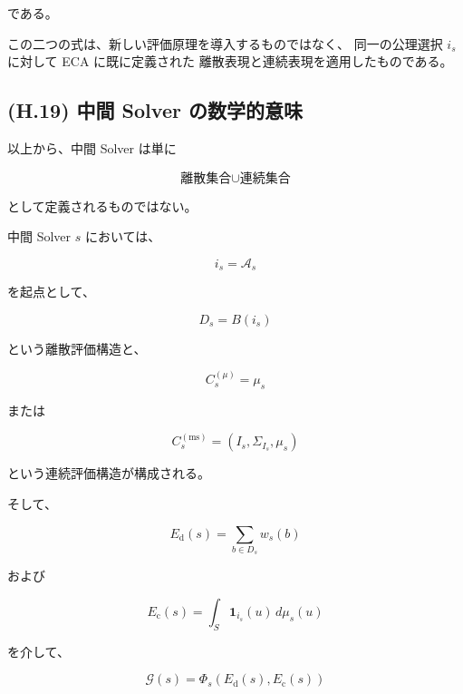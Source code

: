 \documentclass[a4paper,11pt]{article}
\begin{document}
である。

この二つの式は、新しい評価原理を導入するものではなく、
同一の公理選択 $i_s$ に対して ECA に既に定義された
離散表現と連続表現を適用したものである。


\subsection{(H.19) 中間 Solver の数学的意味}
\label{subsec:H19}

以上から、中間 Solver は単に

\begin{equation}
    \text{離散集合}\cup\text{連続集合}
\end{equation}

として定義されるものではない。

中間 Solver $s$ においては、

\begin{equation}
    i_s=\mathcal{A}_s
\end{equation}

を起点として、

\begin{equation}
    D_s=B(i_s)
\end{equation}

という離散評価構造と、

\begin{equation}
    C_s^{(\mu)}=\mu_s
\end{equation}

または

\begin{equation}
    C_s^{(\mathrm{ms})}
    =
    (I_s,\Sigma_{I_s},\mu_s)
\end{equation}

という連続評価構造が構成される。

そして、

\begin{equation}
    E_{\mathrm d}(s)
    =
    \sum_{b\in D_s}w_s(b)
\end{equation}

および

\begin{equation}
    E_{\mathrm c}(s)
    =
    \int_S
    \mathbf1_{i_s}(u)\,d\mu_s(u)
\end{equation}

を介して、

\begin{equation}
    \mathcal{G}(s)
    =
    \Phi_s
    \left(
        E_{\mathrm d}(s),
        E_{\mathrm c}(s)
    \right)
\end{equation}
\end{document}
